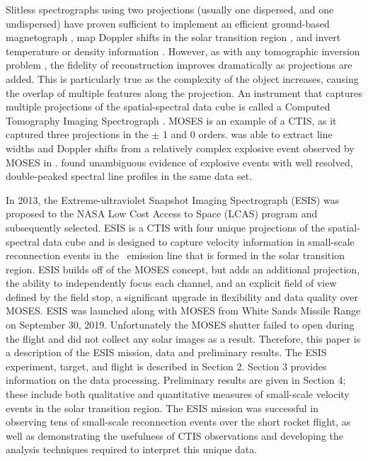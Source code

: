     Slitless spectrographs using two projections (usually one dispersed, and one undispersed) have proven sufficient to implement an efficient ground-based magnetograph \citep{DeforestStereoscopy2004}, map Doppler shifts in the solar transition region \citep{Courrier2018}, and invert temperature or density information \citep{winebarger2019}. 
    However, as with any tomographic inversion problem \citep[e.g.,][]{KakSlaney2001}, the fidelity of reconstruction improves dramatically as projections are added. 
    This is particularly true as the complexity of the object increases, causing the overlap of multiple features along the projection. 
    An instrument that captures multiple projections of the spatial-spectral data cube is called a Computed Tomography Imaging Spectrograph  \cite[CTIS,][]{DescourDereniakCTIS1995}.  
    MOSES is an example of a CTIS, as it captured three projections in the $\pm$ 1 and 0 orders.  
    \cite{Fox2010} was able to extract line widths and Doppler shifts from a relatively complex explosive event observed by MOSES in \heii.  
    \cite{Rust2019} found unambiguous evidence of explosive events with well resolved, double-peaked spectral line profiles in the same data set.
    
    In 2013, the Extreme-ultraviolet Snapshot Imaging Spectrograph (ESIS) was proposed to the NASA Low Cost Access to Space (LCAS) program and subsequently selected.  
    ESIS is a CTIS with four unique projections of the spatial-spectral data cube and is designed to capture velocity information in small-scale reconnection events in the \ov \ emission line that is formed in the solar transition region. 
    ESIS builds off of the MOSES concept, but adds an additional projection, the ability to independently focus each channel, and an explicit field of view defined by the field stop, a significant upgrade in flexibility and data quality over MOSES.
    ESIS was launched along with MOSES from White Sands Missile Range on September 30,  2019.
    Unfortunately the MOSES shutter failed to open during the flight and did not collect any solar images as a result.
    Therefore, this paper is a description of the ESIS mission, data and preliminary results.  
    The ESIS experiment, target, and flight is described in Section 2.  
    Section 3 provides information on the data processing.  Preliminary results are given in Section 4; these include both qualitative and quantitative measures of small-scale velocity events in the solar transition region.  The ESIS mission was successful in  observing tens of small-scale reconnection events over the short rocket flight, as well as demonstrating the usefulness of CTIS observations and developing the analysis techniques required to interpret this unique data.



